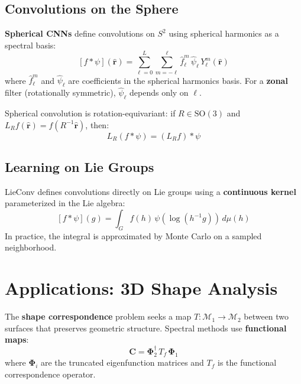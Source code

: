 \subsection{Convolutions on the Sphere}

\begin{definition}
\textbf{Spherical CNNs} define convolutions on $S^2$ using spherical
harmonics as a spectral basis:
\[
    [f * \psi](\hat{\mathbf{r}}) = \sum_{\ell=0}^{L} \sum_{m=-\ell}^{\ell}
    \hat{f}_\ell^m\, \hat{\psi}_\ell\, Y_\ell^m(\hat{\mathbf{r}})
\]
where $\hat{f}_\ell^m$ and $\hat{\psi}_\ell$ are coefficients in the spherical
harmonics basis. For a \textbf{zonal} filter (rotationally symmetric),
$\hat{\psi}_\ell$ depends only on $\ell$.
\end{definition}

\begin{theorem}
Spherical convolution is rotation-equivariant: if $R \in \mathrm{SO}(3)$ and
$L_R f(\hat{\mathbf{r}}) = f(R^{-1}\hat{\mathbf{r}})$, then:
\[
    L_R(f * \psi) = (L_R f) * \psi
\]
\end{theorem}

\subsection{Learning on Lie Groups}

\begin{definition}
LieConv defines convolutions directly on Lie groups using a \textbf{continuous
kernel} parameterized in the Lie algebra:
\[
    [f * \psi](g) = \int_G f(h)\, \psi(\log(h^{-1}g))\, d\mu(h)
\]
In practice, the integral is approximated by Monte Carlo on a sampled
neighborhood.
\end{definition}

\section{Applications: 3D Shape Analysis}

\begin{definition}
The \textbf{shape correspondence} problem seeks a map
$T: \mathcal{M}_1 \to \mathcal{M}_2$ between two surfaces that preserves
geometric structure. Spectral methods use \textbf{functional maps}:
\[
    \mathbf{C} = \boldsymbol{\Phi}_2^\dagger\, T_f\, \boldsymbol{\Phi}_1
\]
where $\boldsymbol{\Phi}_i$ are the truncated eigenfunction matrices and
$T_f$ is the functional correspondence operator.
\end{definition}

